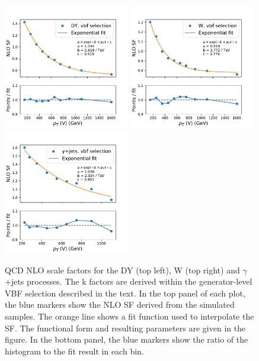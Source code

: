 \begin{figure}[ht!]
    \begin{center}
        \includegraphics[width=0.49\textwidth]{fig/theory/qcdnlo/interpolation_vbf_dy.pdf}
        \includegraphics[width=0.49\textwidth]{fig/theory/qcdnlo/interpolation_vbf_wjet.pdf} \\
        \includegraphics[width=0.49\textwidth]{fig/theory/qcdnlo/interpolation_vbf_gjets.pdf}
        \caption{
            QCD NLO scale factors for the DY (top left), W (top right) and $\gamma$+jets processes.
            The k factors are derived within the generator-level VBF selection described in the text.
            In the top panel of each plot, the blue markers show the NLO SF derived from the simulated samples. The orange line shows a fit function used
            to interpolate the SF. The functional form and resulting parameters are given in the figure. In the bottom panel, the blue markers
            show the ratio of the histogram to the fit result in each bin.
          }
      \label{fig:theory_sf_qcd_nlo}
    \end{center}
  \end{figure}

